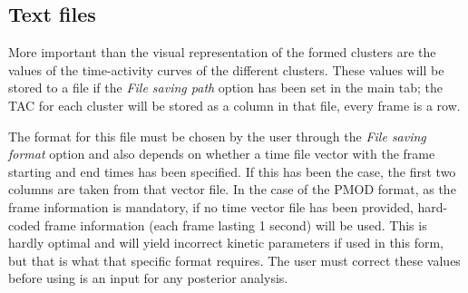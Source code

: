 \documentclass[11pt]{article} %
\begin{document}
\subsection{Text files}
\label{subsec:results_text}

More important than the visual representation of the formed clusters are the values of the time-activity curves of the different
clusters. These values will be stored to a file if the {\em File saving path} option has been set in the main tab; the TAC for
each cluster will be stored as a column in that file, every frame is a row.

The format for this file must be chosen by the user through the {\em File saving format} option and also depends on whether
a time file vector with the frame starting and end times has been specified. If this has been the case, the first two columns
are taken from that vector file. In the case of the PMOD format, as the frame information is mandatory, if no time vector file
has been provided, hard-coded frame information (each frame lasting 1 second) will be used. This is hardly optimal and will yield incorrect kinetic parameters if used in this form, but that is what that specific format requires. The user must correct these values before using is an input for any posterior analysis.
\end{document}

